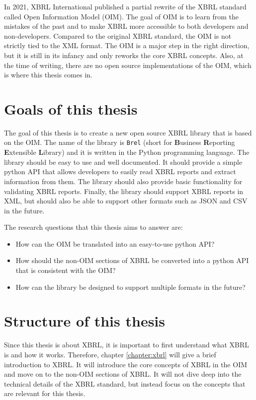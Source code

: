 In 2021, XBRL International published a partial rewrite of the XBRL standard called Open Information Model (OIM)\cite{oim}.
The goal of OIM is to learn from the mistakes of the past and to make XBRL more accessible to both developers and non-developers.
Compared to the original XBRL standard, the OIM is not strictly tied to the XML format.
The OIM is a major step in the right direction, but it is still in its infancy and only reworks the core XBRL concepts.
Also, at the time of writing, there are no open source implementations of the OIM, which is where this thesis comes in.

\section{Goals of this thesis}

The goal of this thesis is to create a new open source XBRL library that is based on the OIM.
The name of the library is \texttt{Brel} (short for \textbf{B}usiness \textbf{R}eporting \textbf{E}xtensible \textbf{L}ibrary) and it is written in the Python programming language.
The library should be easy to use and well documented.
It should provide a simple python API that allows developers to easily read XBRL reports and extract information from them.
The library should also provide basic functionality for validating XBRL reports.
Finally, the library should support XBRL reports in XML, but should also be able to support other formats such as JSON and CSV in the future.

The research questions that this thesis aims to answer are:

\begin{itemize}
    \item How can the OIM be translated into an easy-to-use python API?
    \item How should the non-OIM sections of XBRL be converted into a python API that is consistent with the OIM?
    \item How can the library be designed to support multiple formats in the future?
\end{itemize}

\section{Structure of this thesis}

Since this thesis is about XBRL, it is important to first understand what XBRL is and how it works.
Therefore, chapter \ref{chapter:xbrl} will give a brief introduction to XBRL. 
It will introduce the core concepts of XBRL in the OIM and move on to the non-OIM sections of XBRL.
It will not dive deep into the technical details of the XBRL standard, but instead focus on the concepts that are relevant for this thesis.

